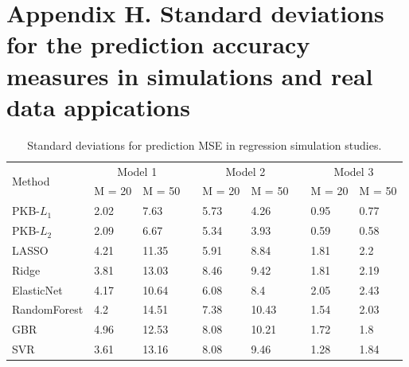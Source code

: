\documentclass[a4paper,12pt]{article}
\begin{document}
\section*{Appendix H. Standard deviations for the prediction accuracy measures in simulations and real data appications}
\label{sec:std}

\begin{table}[htp]
	\centering
	\begin{tabular}{lllllllll}
		\hline
		\multirow{2}{*}{Method} & \multicolumn{2}{c}{Model 1} &  & \multicolumn{2}{c}{Model 2} &  & \multicolumn{2}{c}{Model 3} \\ \cline{2-3} \cline{5-6} \cline{8-9} 
		& M = 20       & M = 50       &  & M = 20       & M = 50       &  & M = 20       & M = 50       \\ \hline
		PKB-$L_1$                  & 2.02         & 7.63         &  & 5.73         & 4.26         &  & 0.95         & 0.77         \\
		PKB-$L_2$                & 2.09         & 6.67         &  & 5.34         & 3.93         &  & 0.59         & 0.58         \\
		LASSO                   & 4.21         & 11.35        &  & 5.91         & 8.84         &  & 1.81         & 2.2          \\
		Ridge                   & 3.81         & 13.03        &  & 8.46         & 9.42         &  & 1.81         & 2.19         \\
		ElasticNet              & 4.17         & 10.64        &  & 6.08         & 8.4          &  & 2.05         & 2.43         \\
		RandomForest            & 4.2          & 14.51        &  & 7.38         & 10.43        &  & 1.54         & 2.03         \\
		GBR                     & 4.96         & 12.53        &  & 8.08         & 10.21        &  & 1.72         & 1.8          \\
		SVR                     & 3.61         & 13.16        &  & 8.08         & 9.46         &  & 1.28         & 1.84         \\ \hline
	\end{tabular}
	\caption{Standard deviations for prediction MSE in regression simulation studies.}
\end{table}
\end{document}
